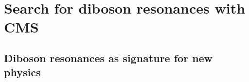 \documentclass[a4paper, 11pt, twoside, openany]{ThesisStyle}
\begin{document}
\begin{titlepage}

\end{titlepage}

\tableofcontents

\newpage
{}


	
	
	
	
	

\part{Search for diboson resonances with CMS}

\chapter{Diboson resonances as signature for new physics}

	

	

			
\end{document}
